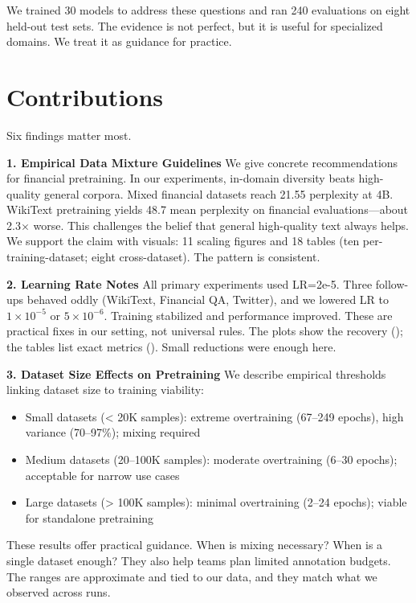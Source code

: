 We trained 30 models to address these questions and ran 240 evaluations on eight held-out test sets. The evidence is not perfect, but it is useful for specialized domains. We treat it as guidance for practice.

\section{Contributions}

Six findings matter most.

\textbf{1. Empirical Data Mixture Guidelines}
We give concrete recommendations for financial pretraining. In our experiments, in-domain diversity beats high-quality general corpora. Mixed financial datasets reach 21.55 perplexity at 4B. WikiText pretraining yields 48.7 mean perplexity on financial evaluations—about 2.3$\times$ worse. This challenges the belief that general high-quality text always helps. We support the claim with visuals: 11 scaling figures and 18 tables (ten per-training-dataset; eight cross-dataset). The pattern is consistent.

\textbf{2. Learning Rate Notes}
All primary experiments used LR=2e-5. Three follow-ups behaved oddly (WikiText, Financial QA, Twitter), and we lowered LR to $1\times10^{-5}$ or $5\times10^{-6}$. Training stabilized and performance improved. These are practical fixes in our setting, not universal rules. The plots show the recovery (); the tables list exact metrics (). Small reductions were enough here.

\textbf{3. Dataset Size Effects on Pretraining}
We describe empirical thresholds linking dataset size to training viability:
\begin{itemize}
    \item Small datasets (< 20K samples): extreme overtraining (67--249 epochs), high variance (70--97\%); mixing required
    \item Medium datasets (20--100K samples): moderate overtraining (6--30 epochs); acceptable for narrow use cases
    \item Large datasets (> 100K samples): minimal overtraining (2--24 epochs); viable for standalone pretraining
\end{itemize}
These results offer practical guidance. When is mixing necessary? When is a single dataset enough? They also help teams plan limited annotation budgets. The ranges are approximate and tied to our data, and they match what we observed across runs.

